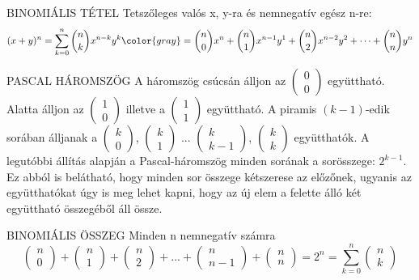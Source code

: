 \begin{tetel}{BINOMIÁLIS TÉTEL}
  Tetszőleges valós x, y-ra és nemnegatív egész n-re:
  \[ (x+y)^n = \sum_{k=0}^{n} \binom{n}{k} x^{n-k}y^{k} {\color{gray} = \binom{n}{0}x^n + \binom{n}{1}x^{n-1}y^1 + \binom{n}{2}x^{n-2}y^2 + \dots + \binom{n}{n}y^n } \]
\end{tetel}

\begin{definicio}{PASCAL HÁROMSZÖG}
A háromszög csúcsán álljon az  $\begin{pmatrix}
0\\0
\end{pmatrix}$ együttható. Alatta álljon az $\begin{pmatrix}
1\\0
\end{pmatrix}$ illetve a $\begin{pmatrix}
1\\1
\end{pmatrix}$ együttható. A piramis $(k-1)$-edik sorában álljanak a $\begin{pmatrix}
k\\0
\end{pmatrix}$, $\begin{pmatrix}
k\\1
\end{pmatrix}$ ... $\begin{pmatrix}
k\\k-1
\end{pmatrix}$, $\begin{pmatrix}
k\\k
\end{pmatrix}$ együtthatók. A legutóbbi állítás alapján a Pascal-háromszög minden sorának a sorösszege:
$2^{k-1}$. Ez abból is belátható, hogy minden sor összege kétszerese az előzőnek, ugyanis az együtthatókat úgy is meg lehet kapni, hogy az új elem a felette álló két együttható összegéből áll össze.
\end{definicio}

\begin{tetel}{BINOMIÁLIS ÖSSZEG}
Minden n nemnegatív számra
$$\begin{pmatrix}
n\\0
\end{pmatrix} + \begin{pmatrix}
n\\1
\end{pmatrix} + \begin{pmatrix}
n\\2
\end{pmatrix} + ... + \begin{pmatrix}
n\\n-1
\end{pmatrix} + \begin{pmatrix}
n\\n
\end{pmatrix} = 2^n = \sum_{k = 0}^{n}\begin{pmatrix}
n\\k
\end{pmatrix}$$
\end{tetel}

